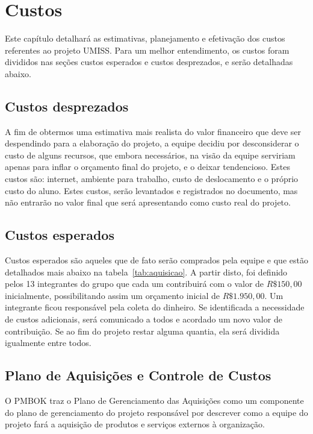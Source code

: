 \chapter{Custos}

Este capítulo detalhará as estimativas, planejamento e efetivação dos custos
referentes ao projeto UMISS. Para um melhor entendimento, os custos foram divididos
nas seções custos esperados e custos desprezados, e serão detalhadas abaixo.

\section{Custos desprezados}

A fim de obtermos uma estimativa mais realista do valor financeiro que deve ser
despendindo para a elaboração do projeto, a equipe decidiu por desconsiderar o custo
de alguns recursos, que embora necessários, na visão da equipe serviriam apenas
para inflar o orçamento final do projeto, e o deixar tendencioso. Estes custos são: internet, ambiente para
trabalho, custo de deslocamento e o próprio custo do aluno.
Estes custos, serão levantados e registrados no documento, mas não entrarão no valor
final que será apresentando como custo real do projeto.

\section{Custos esperados}

Custos esperados são aqueles que de fato serão comprados pela equipe e que estão detalhados mais abaixo
na tabela~\ref{tab:aquisicao}. A partir disto, foi definido pelos 13 integrantes do grupo que cada
um contribuirá com o valor de $R\$150,00$ inicialmente, possibilitando assim um orçamento
inicial de $R\$ 1.950,00$. Um integrante ficou responsável pela coleta do dinheiro.
Se identificada a necessidade de custos adicionais, será comunicado a todos e acordado
um novo valor de contribuição. Se ao fim do projeto restar alguma quantia, ela
será dividida igualmente entre todos.

\section{Plano de Aquisições e Controle de Custos}

O PMBOK traz o Plano de Gerenciamento das Aquisições como um componente do plano
de gerenciamento do projeto responsável por descrever como a equipe do projeto
fará a aquisição de produtos e serviços externos à organização.

